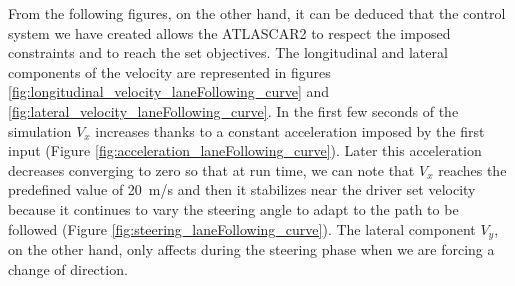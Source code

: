 From the following figures, on the other hand, it can be deduced that the control system we have created allows the ATLASCAR2 to respect the imposed constraints and to reach the set objectives. The longitudinal and lateral components of the velocity are represented in figures \ref{fig:longitudinal_velocity_laneFollowing_curve} and \ref{fig:lateral_velocity_laneFollowing_curve}. In the first few seconds of the simulation $V_x$ increases thanks to a constant acceleration imposed by the first input (Figure \ref{fig:acceleration_laneFollowing_curve}). Later this acceleration decreases converging to zero so that at run time, we can note that $V_x$ reaches the predefined value of \SI{20}{m/s} and then it stabilizes near the driver set velocity because it continues to vary the steering angle to adapt to the path to be followed (Figure \ref{fig:steering_laneFollowing_curve}). The lateral component $V_y$, on the other hand, only affects during the steering phase when we are forcing a change of direction.
